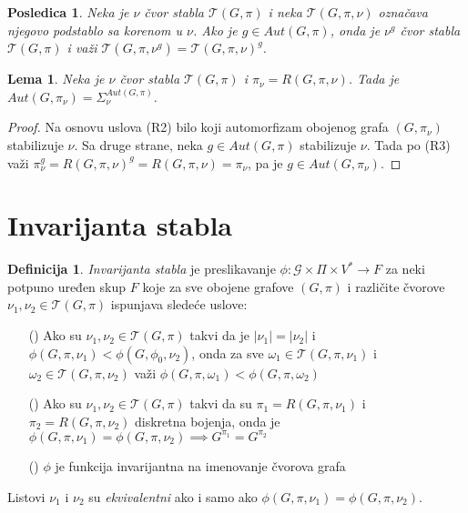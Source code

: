 \documentclass[12pt,oneside]{memoir}
\newtheorem{lemma}{Lema}
\newtheorem{corrolary}{Posledica}
\theoremstyle{definition}
\newtheorem*{definition}{Definicija}
\begin{document}
  \begin{corrolary}
	  \label{corr:auttree}
      Neka je $\nu$ čvor stabla $\mathcal{T}(G, \pi)$ i neka $\mathcal{T}(G,
      \pi, \nu)$ označava njegovo podstablo sa korenom u $\nu$. Ako je $g
      \in Aut(G, \pi)$, onda je $\nu^g$ čvor stabla $\mathcal{T}(G, \pi)$ i
      važi $\mathcal{T}(G, \pi, \nu^g) = \mathcal{T}(G, \pi, \nu)^g$.
  \end{corrolary}

  \begin{lemma}
      Neka je $\nu$ čvor stabla $\mathcal{T}(G, \pi)$ i $\pi_\nu = R(G, \pi,
      \nu)$. Tada je $Aut(G, \pi_\nu) = \Sigma_\nu^{Aut(G, \pi)}$.
  \end{lemma}

  \begin{proof}
	  Na osnovu uslova (R2) bilo koji automorfizam obojenog grafa $(G,
	  \pi_\nu)$ stabilizuje $\nu$. Sa druge strane, neka $g \in Aut(G, \pi)$
	  stabilizuje $\nu$. Tada po (R3) važi $\pi_\nu^g = R(G, \pi, \nu)^g = R(G,
	  \pi, \nu) = \pi_\nu$, pa je $g \in Aut(G, \pi_\nu)$.
  \end{proof}

 \section{Invarijanta stabla}

  \begin{definition}
	  \emph{Invarijanta stabla} je preslikavanje $\phi : \mathcal{G} \times \Pi
	  \times V^* \to F$ za neki potpuno uređen skup $F$ koje za sve obojene
	  grafove $(G, \pi)$ i različite čvorove $\nu_1, \nu_2 \in \mathcal{T}(G,
	  \pi)$ ispunjava sledeće uslove:

	  \begin{itemize}
		  \item[(\phi1)] Ako su $\nu_1, \nu_2 \in \mathcal{T}(G, \pi)$ takvi
			  da je $|\nu_1|=|\nu_2|$ i $\phi(G, \pi, \nu_1) < \phi(G,
			  \phi_0, \nu_2)$, onda za sve $\omega_1 \in \mathcal{T}(G, \pi,
			  \nu_1)$ i $\omega_2 \in \mathcal{T}(G, \pi, \nu_2)$ važi
			  $\phi(G, \pi, \omega_1) < \phi(G, \pi, \omega_2)$
		  \item[(\phi2)] Ako su $\nu_1, \nu_2 \in \mathcal{T}(G, \pi)$ takvi
			  da su $\pi_1 = R(G, \pi, \nu_1)$ i $\pi_2 = R(G, \pi, \nu_2)$
			  diskretna bojenja, onda je $\phi(G, \pi, \nu_1) = \phi(G,
			  \pi, \nu_2) \implies G^{\pi_1} = G^{\pi_2}$
		  \item[(\phi3)] $\phi$ je funkcija invarijantna na imenovanje čvorova
			  grafa
	  \end{itemize}

	  Listovi $\nu_1$ i $\nu_2$ su \emph{ekvivalentni} ako i samo ako $\phi(G,
	  \pi, \nu_1) = \phi(G, \pi, \nu_2)$.
  \end{definition}
\end{document}
